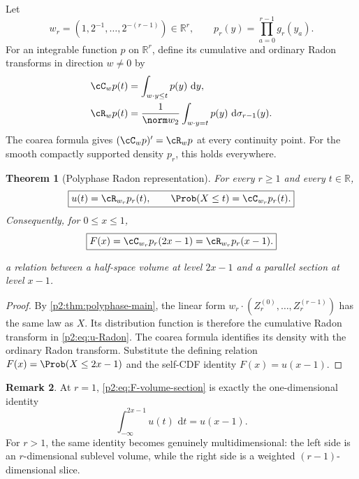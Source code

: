 \documentclass[11pt,oneside]{article}
\newtheorem{theorem}{Theorem}[section]
\theoremstyle{definition}
\newtheorem{remark}[theorem]{Remark}
\newcommand{\dd}{\,\mathrm d}
\newcommand{\R}{\mathbb R}
\begin{document}
Let
\begin{equation}
 w_r=(1,2^{-1},\ldots,2^{-(r-1)})\in\R^r,
 \qquad
 p_r(y)=\prod_{a=0}^{r-1}g_r(y_a).                         \label{p2:eq:wr-pr}
\end{equation}
For an integrable function $p$ on $\R^r$, define its cumulative and ordinary
Radon transforms in direction $w\ne0$ by
\begin{align}
 \cC_wp(t)&=\int_{w\cdot y\le t}p(y)\,\dd y,              \label{p2:eq:cumulative-Radon}\\
 \cR_wp(t)&=\frac1{\norm w_2}
   \int_{w\cdot y=t}p(y)\,\dd\sigma_{r-1}(y).             \label{p2:eq:Radon-def}
\end{align}
The coarea formula gives $(\cC_wp)'=\cR_wp$ at every continuity point.
For the smooth compactly supported density $p_r$, this holds everywhere.

\begin{theorem}[Polyphase Radon representation]
\label{p2:thm:Radon-representation}
For every $r\ge1$ and every $t\in\R$,
\begin{equation}
 \boxed{\displaystyle
 u(t)=\cR_{w_r}p_r(t),
 \qquad
 \Prob(X\le t)=\cC_{w_r}p_r(t).}                          \label{p2:eq:u-Radon}
\end{equation}
Consequently, for $0\le x\le1$,
\begin{equation}
 \boxed{\displaystyle
 F(x)=\cC_{w_r}p_r(2x-1)=\cR_{w_r}p_r(x-1).}              \label{p2:eq:F-volume-section}
\end{equation}

a relation between a half-space volume at level $2x-1$ and a parallel section
at level $x-1$.
\end{theorem}

\begin{proof}
By \cref{p2:thm:polyphase-main}, the linear form
$w_r\cdot(Z_r^{(0)},\ldots,Z_r^{(r-1)})$ has the same law as $X$.
Its distribution function is therefore the cumulative Radon transform in
\eqref{p2:eq:u-Radon}.  The coarea formula identifies its density with the
ordinary Radon transform.  Substitute the defining relation
$F(x)=\Prob(X\le2x-1)$ and the self-CDF identity $F(x)=u(x-1)$.
\end{proof}

\begin{remark}
At $r=1$, \eqref{p2:eq:F-volume-section} is exactly the one-dimensional identity
\[
 \int_{-\infty}^{2x-1}u(t)\,\dd t=u(x-1).
\]
For $r>1$, the same identity becomes genuinely multidimensional: the left side
is an $r$-dimensional sublevel volume, while the right side is a weighted
$(r-1)$-dimensional slice.
\end{remark}
\end{document}
